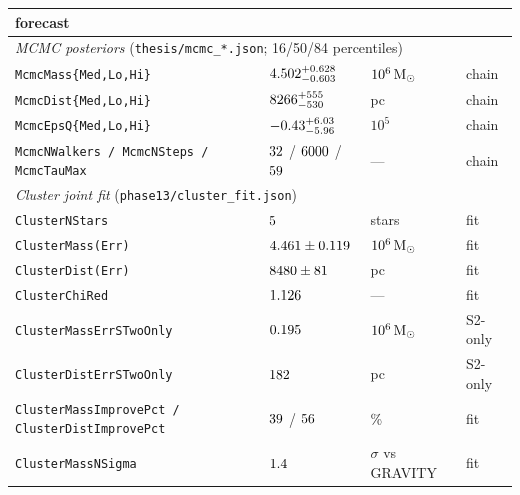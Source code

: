 \begin{table}[p]
\begin{tabular}{llll}
  forecast \\
\midrule
\multicolumn{4}{l}{\emph{MCMC posteriors}
(\texttt{thesis/mcmc\_*.json}; 16/50/84 percentiles)}\\
\texttt{McmcMass\{Med,Lo,Hi\}} &
  $4.502{}^{+0.628}_{-0.603}$ & $10^6\,\mathrm{M}_\odot$ &
  chain \\
\texttt{McmcDist\{Med,Lo,Hi\}} &
  $8266{}^{+555}_{-530}$ & pc & chain \\
\texttt{McmcEpsQ\{Med,Lo,Hi\}} &
  $-0.43{}^{+6.03}_{-5.96}$ & $10^5$ & chain \\
\texttt{McmcNWalkers / McmcNSteps / McmcTauMax} &
  $32$ / $6000$ / $59$ & --- & chain \\
\midrule
\multicolumn{4}{l}{\emph{Cluster joint fit}
(\texttt{phase13/cluster\_fit.json})}\\
\texttt{ClusterNStars} & $5$ & stars & fit \\
\texttt{ClusterMass(Err)} & $4.461\pm0.119$ &
  $10^6\,\mathrm{M}_\odot$ & fit \\
\texttt{ClusterDist(Err)} & $8480\pm81$ & pc &
  fit \\
\texttt{ClusterChiRed} & $1.126$ & --- & fit \\
\texttt{ClusterMassErrSTwoOnly} & $0.195$ &
  $10^6\,\mathrm{M}_\odot$ & S2-only \\
\texttt{ClusterDistErrSTwoOnly} & $182$ & pc &
  S2-only \\
\texttt{ClusterMassImprovePct / ClusterDistImprovePct} &
  $39$ / $56$ & \% & fit \\
\texttt{ClusterMassNSigma} & $1.4$ & $\sigma$ vs
  GRAVITY & fit \\
\bottomrule
\end{tabular}
\end{table}

